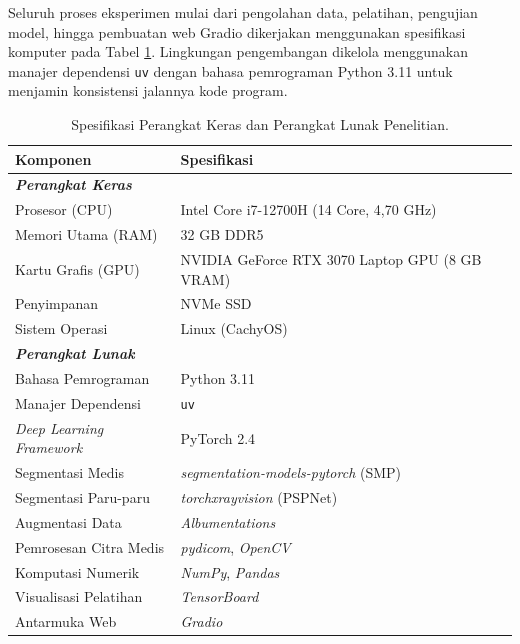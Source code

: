 \documentclass[12pt,a4paper,oneside]{book}
\begin{document}
Seluruh proses eksperimen mulai dari pengolahan data, pelatihan, pengujian model, hingga pembuatan web Gradio dikerjakan menggunakan spesifikasi komputer pada Tabel \ref{tab:hardware_spec}. Lingkungan pengembangan dikelola menggunakan manajer dependensi \texttt{uv} dengan bahasa pemrograman Python 3.11 untuk menjamin konsistensi jalannya kode program.

\begin{table}[H]
  \centering
  \caption{Spesifikasi Perangkat Keras dan Perangkat Lunak Penelitian.}
  \label{tab:hardware_spec}
  \begin{tabular}{l l}
    \toprule
    \textbf{Komponen} & \textbf{Spesifikasi} \\
    \midrule
    \multicolumn{2}{l}{\textit{\textbf{Perangkat Keras}}} \\
    \midrule
    Prosesor (CPU)    & Intel Core i7-12700H (14 Core, 4,70 GHz) \\
    Memori Utama (RAM) & 32 GB DDR5 \\
    Kartu Grafis (GPU) & NVIDIA GeForce RTX 3070 Laptop GPU (8 GB VRAM) \\
    Penyimpanan       & NVMe SSD \\
    Sistem Operasi    & Linux (CachyOS) \\
    \midrule
    \multicolumn{2}{l}{\textit{\textbf{Perangkat Lunak}}} \\
    \midrule
    Bahasa Pemrograman       & Python 3.11 \\
    Manajer Dependensi       & \texttt{uv} \\
    \textit{Deep Learning Framework} & PyTorch 2.4 \\
    Segmentasi Medis         & \textit{segmentation-models-pytorch} (SMP) \\
    Segmentasi Paru-paru     & \textit{torchxrayvision} (PSPNet) \\
    Augmentasi Data          & \textit{Albumentations} \\
    Pemrosesan Citra Medis   & \textit{pydicom}, \textit{OpenCV} \\
    Komputasi Numerik        & \textit{NumPy}, \textit{Pandas} \\
    Visualisasi Pelatihan    & \textit{TensorBoard} \\
    Antarmuka Web            & \textit{Gradio} \\
    \bottomrule
  \end{tabular}
\end{table}

\end{document}
